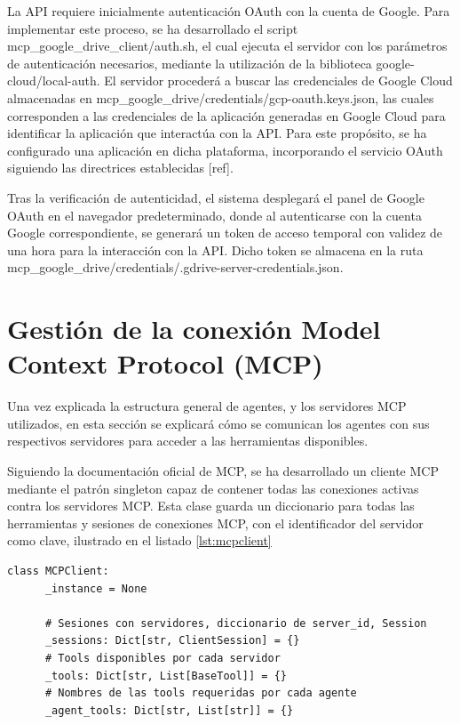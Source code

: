 \begin{itemize}
La API requiere inicialmente autenticación OAuth con la cuenta de Google. Para implementar este proceso, se ha desarrollado el script mcp\_google\_drive\_client/auth.sh, el cual ejecuta el servidor con los parámetros de autenticación necesarios, mediante la utilización de la biblioteca google-cloud/local-auth. El servidor procederá a buscar las credenciales de Google Cloud almacenadas en mcp\_google\_drive/credentials/gcp-oauth.keys.json, las cuales corresponden a las credenciales de la aplicación generadas en Google Cloud para identificar la aplicación que interactúa con la API. Para este propósito, se ha configurado una aplicación en dicha plataforma, incorporando el servicio OAuth siguiendo las directrices establecidas [ref].

Tras la verificación de autenticidad, el sistema desplegará el panel de Google OAuth en el navegador predeterminado, donde al autenticarse con la cuenta Google correspondiente, se generará un token de acceso temporal con validez de una hora para la interacción con la API. Dicho token se almacena en la ruta mcp\_google\_drive/credentials/.gdrive-server-credentials.json.

\end{itemize}

\section{Gestión de la conexión Model Context Protocol (MCP)}
\label{sec:gestionmcp}
Una vez explicada la estructura general de agentes, y los servidores MCP utilizados, en esta sección se explicará cómo se comunican los agentes con sus respectivos servidores para acceder a las herramientas disponibles.

Siguiendo la documentación oficial de MCP, se ha desarrollado un cliente MCP mediante el patrón singleton capaz de contener todas las conexiones activas contra los servidores MCP. Esta clase guarda un diccionario para todas las herramientas y sesiones de conexiones MCP, con el identificador del servidor como clave, ilustrado en el listado \ref{lst:mcpclient}

\begin{lstlisting}[caption={Clase singleton MCPClient},label={lst:mcpclient}]
  class MCPClient:
      _instance = None

      # Sesiones con servidores, diccionario de server_id, Session
      _sessions: Dict[str, ClientSession] = {}
      # Tools disponibles por cada servidor
      _tools: Dict[str, List[BaseTool]] = {}
      # Nombres de las tools requeridas por cada agente
      _agent_tools: Dict[str, List[str]] = {}
\end{lstlisting}

